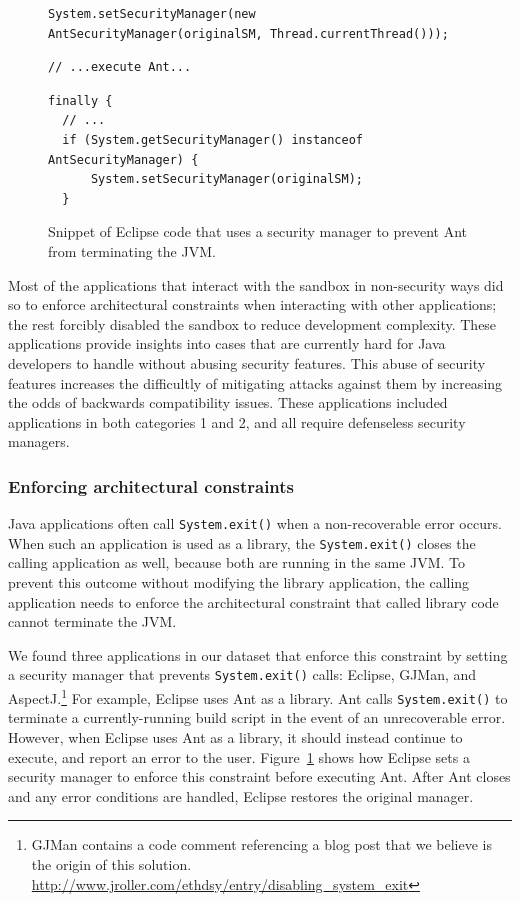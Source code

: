 \documentclass{sig-alternate}
\begin{document}
\begin{figure}
\begin{lstlisting}[firstnumber=691]
System.setSecurityManager(new AntSecurityManager(originalSM, Thread.currentThread()));
\end{lstlisting}
\vspace{-0.3cm}
\begin{lstlisting}[firstnumber=703]
// ...execute Ant...
\end{lstlisting}
\vspace{-0.3cm}
\begin{lstlisting}[firstnumber=723]
finally {
  // ...
  if (System.getSecurityManager() instanceof AntSecurityManager) { 
      System.setSecurityManager(originalSM); 
  }
\end{lstlisting}\vspace{-0.3cm}
\caption{Snippet of Eclipse code that uses a security manager to prevent Ant\label{fig:Eclipse-snippet}
from terminating the JVM.}
\end{figure}

Most of the applications that interact with the sandbox in
non-security ways did so to enforce architectural constraints when interacting with
other applications; the rest forcibly disabled the sandbox to reduce development
complexity. These applications provide insights into cases that are currently
hard for Java developers to handle without abusing security features. This abuse
of security features increases the difficultly of mitigating attacks against
them by increasing the odds of backwards compatibility issues.  These applications
included applications in both categories 1 and 2, and all require defenseless security managers.

\subsubsection{Enforcing architectural constraints}

Java applications often call \texttt{System.exit()} when a non-recoverable
error occurs.  When such an application is 
used as a library, the \texttt{System.exit()} closes the calling
application as well, because both 
are running in the same JVM. 
To prevent this outcome without modifying the library application,
the calling application needs to enforce the architectural constraint
that called library code cannot terminate the JVM. 

We found three applications in our dataset that 
enforce this constraint by setting a security manager
that prevents \texttt{System.exit()} calls:
Eclipse, GJMan, and AspectJ.\footnote{%
GJMan contains a code comment referencing a
blog post that we believe is the origin of this solution. \url{http://www.jroller.com/ethdsy/entry/disabling_system_exit}}
For example, Eclipse uses Ant as a library.  Ant calls \texttt{System.exit()} to
terminate a currently-running build script in the event of an unrecoverable
error.  However, when Eclipse uses Ant as a library, it
should instead continue to execute, and report an error to the user.
Figure~\ref{fig:Eclipse-snippet} shows
how Eclipse sets a security manager to enforce this constraint
before executing Ant. After Ant closes and any error conditions
are handled, Eclipse restores the original manager.
\end{document}
